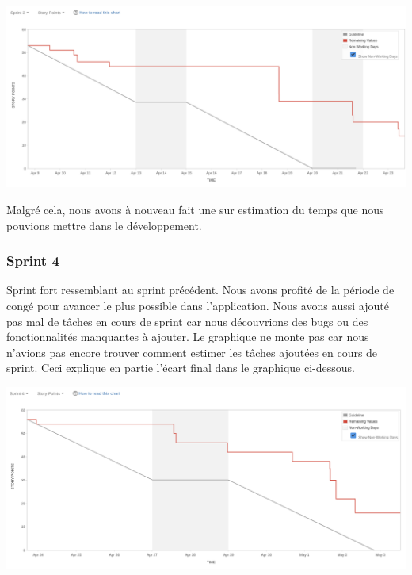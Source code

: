 \documentclass[t, 12pt, usenames,dvipsnames]{article}
\begin{document}
                \begin{center}
                    \includegraphics[scale=.25]{images/graph-new/sprint3.png}
                    \label{fig:sprint3_graph}
                \end{center}
                
                \noindent Malgré cela, nous avons à nouveau fait une sur estimation du temps que nous pouvions mettre dans le développement.
                
                
            \subsubsection{Sprint 4}
                \noindent Sprint fort ressemblant au sprint précédent. Nous avons profité de la période de congé pour avancer le plus possible dans l'application. Nous avons aussi ajouté pas mal de tâches en cours de sprint car nous découvrions des bugs ou des fonctionnalités manquantes à ajouter. Le graphique ne monte pas car nous n'avions pas encore trouver comment estimer les tâches ajoutées en cours de sprint.
                Ceci explique en partie l'écart final dans le graphique ci-dessous.
                
                \begin{center}
                    \includegraphics[scale=.25]{images/graph-new/sprint4.png}
                    \label{fig:sprint4_graph}
                \end{center}
        
\end{document}
